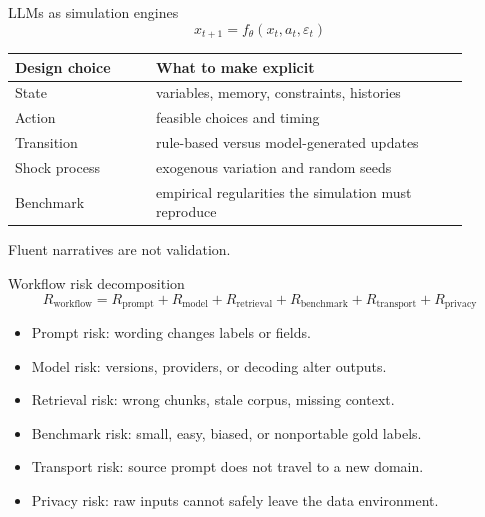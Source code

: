 \documentclass[aspectratio=169,11pt]{beamer}
\newcommand{\1}{\mathbf{1}}
\begin{document}
\begin{frame}{LLMs as simulation engines}
\small
\[
x_{t+1}=f_{\theta}(x_t,a_t,\varepsilon_t)
\]

\begin{tabular}{p{0.28\linewidth} p{0.62\linewidth}}
\toprule
Design choice & What to make explicit \\
\midrule
State & variables, memory, constraints, histories \\
Action & feasible choices and timing \\
Transition & rule-based versus model-generated updates \\
Shock process & exogenous variation and random seeds \\
Benchmark & empirical regularities the simulation must reproduce \\
\bottomrule
\end{tabular}

\medskip
Fluent narratives are not validation.
\end{frame}

\begin{frame}{Workflow risk decomposition}
\small
\[
R_{\text{workflow}}
=R_{\text{prompt}}
+R_{\text{model}}
+R_{\text{retrieval}}
+R_{\text{benchmark}}
+R_{\text{transport}}
+R_{\text{privacy}}
\]

\begin{itemize}
    \item Prompt risk: wording changes labels or fields.
    \item Model risk: versions, providers, or decoding alter outputs.
    \item Retrieval risk: wrong chunks, stale corpus, missing context.
    \item Benchmark risk: small, easy, biased, or nonportable gold labels.
    \item Transport risk: source prompt does not travel to a new domain.
    \item Privacy risk: raw inputs cannot safely leave the data environment.
\end{itemize}
\end{frame}
\end{document}
